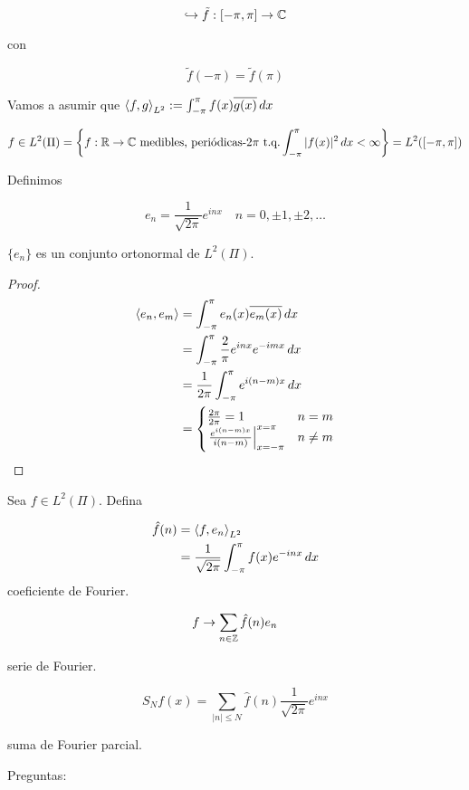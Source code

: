 \[\hookrightarrow \tilde f:[-\pi,\pi]\to\mathbb{C}\]

con

\[\tilde f(-\pi)=\tilde f(\pi)\]

Vamos a asumir que $\left\langle f,g\right\rangle_{L^2}:=\int_{-\pi}^\pi f(x)\overline{g(x)}\,dx$

\[f\in L^2(\Pi)=\left\{f:\mathbb{R}\to\mathbb{C}\text{ medibles, periódicas-$2\pi$ t.q.} \int_{-\pi}^\pi |f(x)|^2\,dx<\infty\right\}=L^2([-\pi,\pi])\]

Definimos 

\[e_n=\frac{1}{\sqrt{2\pi}}e^{inx}\quad n=0,\pm 1,\pm 2,\ldots\]

\begin{fproposition}
    $\{e_n\}$ es un conjunto ortonormal de $L^2(\Pi)$.
\end{fproposition}

\begin{proof}
    \begin{align*}
        \left\langle e_n,e_m\right\rangle&=\int_{-\pi}^\pi e_n(x)\overline{e_m(x)}\,dx\\
        &=\int_{-\pi}^\pi \frac{2}{\pi} e^{inx}e^{-imx}\,dx\\
        &=\frac{1}{2\pi}\int_{-\pi}^\pi e^{i(n-m)x}\,dx\\
        &=\begin{cases}
            \frac{2\pi}{2\pi}=1&n=m\\
            \left.\frac{e^{i(n-m)x}}{i(n-m)}\right|_{x=-\pi}^{x=\pi}&n\neq m
        \end{cases}
    \end{align*}
\end{proof}

\begin{fdefinition}
    Sea $f\in L^2(\Pi)$. Defina 
    
    \begin{align*}
        \hat f (n)&=\left\langle f,e_n\right\rangle_{L^2}\\
        &=\frac{1}{\sqrt{2\pi}}\int_{-\pi}^\pi f(x) e^{-inx}\,dx
    \end{align*}
    coeficiente de Fourier.

    \[f\to \sum_{n\in\mathbb{Z}}\hat f(n)e_n\]

    serie de Fourier.
\end{fdefinition}

\[S_N f(x)=\sum_{|n|\leq N} \hat f(n)\frac{1}{\sqrt{2\pi}} e^{inx}\]

suma de Fourier parcial.

Preguntas:

